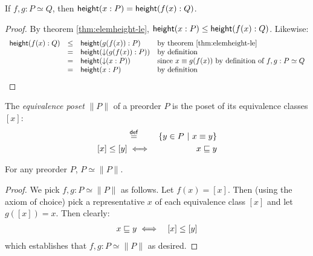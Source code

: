 \documentclass{article}
\newcommand{\ordeq}{\simeq}
\newcommand{\eqposet}[1]{\ms{Eq}(#1)}
\renewcommand{\eqposet}[1]{\|{#1}\|}
\newcommand{\eqclass}[1]{[#1]}
\newcommand{\height}{\ms{height}}
\newcommand{\elemheight}[2]{\height(#2 : #1)}
\newcommand{\down}[2]{\mathop{\downarrow}(#2 : #1)}
\begin{document}
\begin{theorem}
  If $f,g : P \ordeq Q$, then $\elemheight{P}{x} = \elemheight{Q}{f(x)}$.
\end{theorem}
\begin{proof}
  By theorem \ref{thm:elemheight-le}, $\elemheight{P}{x} \le
  \elemheight{Q}{f(x)}$. Likewise:
  \[
  \begin{array}{rcll}
    \elemheight{Q}{f(x)}
    &\le& \elemheight{P}{g(f(x))} & \text{by theorem \ref{thm:elemheight-le}}\\
    &=& \height(\down{P}{g(f(x))}) & \text{by definition}\\
    &=& \height(\down{P}{x})
    & \text{since}~x \equiv g(f(x))~\text{by definition of}~f,g : P \ordeq Q\\
    &=& \elemheight{P}{x} & \text{by definition}
  \end{array}
  \]
\end{proof}

\begin{definition}
  The \emph{equivalence poset} $\eqposet{P}$ of a preorder $P$ is the poset of
  its equivalence classes $\eqclass{x}$:
  \begin{eqnarray*}
    \eqclass{x}  &\defeq&  \setfor{y \in P}{x \aeq y}\\
    \eqclass{x} \le \eqclass{y} &\iff& x \ale y
  \end{eqnarray*}
\end{definition}

\begin{theorem}
  \label{thm:eqposet}
  For any preorder $P$, $P \ordeq \eqposet{P}$.
\end{theorem}
\begin{proof}
  We pick $f,g : P \ordeq \eqposet{P}$ as follows. Let $f(x) = \eqclass{x}$.
  Then (using the axiom of choice) pick a representative $x$ of each equivalence
  class $\eqclass{x}$ and let $g(\eqclass{x}) = x$. Then clearly:
  \begin{eqnarray*}
    x \ale y &\iff& \eqclass{x} \le \eqclass{y}
  \end{eqnarray*}
  which establishes that $f,g : P \ordeq \eqposet{P}$ as desired.
\end{proof}

\end{document}
